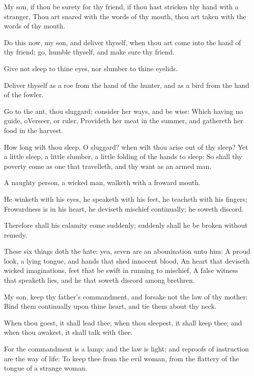 \Chapter
\Verse My son, if thou be surety for thy friend, if thou hast stricken thy hand with a stranger, \Verse Thou art snared with the words of thy mouth, thou art taken with the words of thy mouth.

\Verse Do this now, my son, and deliver thyself, when thou art come into the hand of thy friend; go, humble thyself, and make sure thy friend.

\Verse Give not sleep to thine eyes, nor slumber to thine eyelids.

\Verse Deliver thyself as a roe from the hand of the hunter, and as a bird from the hand of the fowler.

\Verse Go to the ant, thou sluggard; consider her ways, and be wise: \Verse Which having no guide, oVerseer, or ruler, \Verse Provideth her meat in the summer, and gathereth her food in the harvest.

\Verse How long wilt thou sleep, O sluggard? when wilt thou arise out of thy sleep?  \Verse Yet a little sleep, a little slumber, a little folding of the hands to sleep: \Verse So shall thy poverty come as one that travelleth, and thy want as an armed man.

\Verse A naughty person, a wicked man, walketh with a froward mouth.

\Verse He winketh with his eyes, he speaketh with his feet, he teacheth with his fingers; \Verse Frowardness is in his heart, he deviseth mischief continually; he soweth discord.

\Verse Therefore shall his calamity come suddenly; suddenly shall he be broken without remedy.

\Verse These six things doth the \LORD hate: yea, seven are an abomination unto him: \Verse A proud look, a lying tongue, and hands that shed innocent blood, \Verse An heart that deviseth wicked imaginations, feet that be swift in running to mischief, \Verse A false witness that speaketh lies, and he that soweth discord among brethren.

\Verse My son, keep thy father's commandment, and forsake not the law of thy mother: \Verse Bind them continually upon thine heart, and tie them about thy neck.

\Verse When thou goest, it shall lead thee; when thou sleepest, it shall keep thee; and when thou awakest, it shall talk with thee.

\Verse For the commandment is a lamp; and the law is light; and reproofs of instruction are the way of life: \Verse To keep thee from the evil woman, from the flattery of the tongue of a strange woman.

